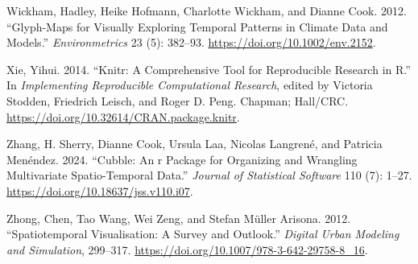 \begin{CSLReferences}{1}{0}
\leavevmode{}%
Wickham, Hadley, Heike Hofmann, Charlotte Wickham, and Dianne Cook. 2012. {``Glyph-Maps for Visually Exploring Temporal Patterns in Climate Data and Models.''} \emph{Environmetrics} 23 (5): 382--93. \url{https://doi.org/10.1002/env.2152}.

\leavevmode{}%
Xie, Yihui. 2014. {``Knitr: A Comprehensive Tool for Reproducible Research in {R}.''} In \emph{Implementing Reproducible Computational Research}, edited by Victoria Stodden, Friedrich Leisch, and Roger D. Peng. Chapman; Hall/CRC. \url{https://doi.org/10.32614/CRAN.package.knitr}.

\leavevmode{}%
Zhang, H. Sherry, Dianne Cook, Ursula Laa, Nicolas Langrené, and Patricia Menéndez. 2024. {``Cubble: An r Package for Organizing and Wrangling Multivariate Spatio-Temporal Data.''} \emph{Journal of Statistical Software} 110 (7): 1--27. \url{https://doi.org/10.18637/jss.v110.i07}.

\leavevmode{}%
Zhong, Chen, Tao Wang, Wei Zeng, and Stefan Müller Arisona. 2012. {``Spatiotemporal Visualisation: A Survey and Outlook.''} \emph{Digital Urban Modeling and Simulation}, 299--317. \url{https://doi.org/10.1007/978-3-642-29758-8_16}.

\end{CSLReferences}


\address{%
Maliny Po\\
Monash University\\%
Department of Econometrics and Business Statistics\\ Melbourne, Australia\\
%
%
\textit{ORCiD: \href{https://orcid.org/0009-0008-4686-6631}{0009-0008-4686-6631}}\\%
\href{mailto:malinypo12@gmail.com}{\nolinkurl{malinypo12@gmail.com}}%
}

\address{%
S. Nathan Yang\\
Duke University\\%
Durham, North Carolina\\
%
%
\textit{ORCiD: \href{https://orcid.org/0009-0002-9985-1042}{0009-0002-9985-1042}}\\%
\href{mailto:nathan.s.yang@gmail.com}{\nolinkurl{nathan.s.yang@gmail.com}}%
}

\address{%
H. Sherry Zhang\\
University of Texas at Austin\\%
Department of Statistics and Data Sciences\\ Austin, Texas\\
%
%
\textit{ORCiD: \href{https://orcid.org/0000-0002-7122-1463}{0000-0002-7122-1463}}\\%
\href{mailto:huizezhangsh@gmail.com}{\nolinkurl{huizezhangsh@gmail.com}}%
}

\address{%
Dianne Cook\\
Monash University\\%
Department of Econometrics and Business Statistics\\ Melbourne, Australia\\
%
%
\textit{ORCiD: \href{https://orcid.org/0000-0002-3813-7155}{0000-0002-3813-7155}}\\%
\href{mailto:dicook@monash.edu}{\nolinkurl{dicook@monash.edu}}%
}
